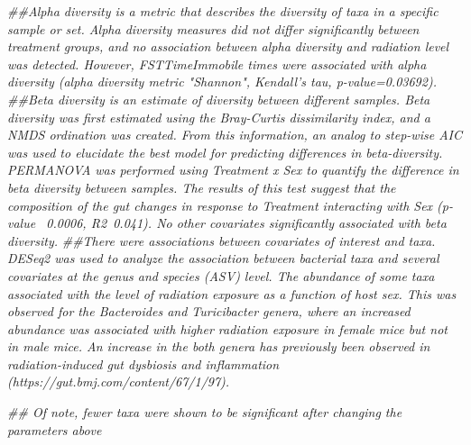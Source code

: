 \documentclass[]{article}
\newenvironment{Shaded}{\begin{snugshade}}{\end{snugshade}}
\newcommand{\CommentTok}[1]{\textcolor[rgb]{0.56,0.35,0.01}{\textit{#1}}}
\begin{document}
\begin{Shaded}
\begin{Highlighting}[]
\CommentTok{##Alpha diversity is a metric that describes the diversity of taxa in a specific sample or set. Alpha diversity measures did not differ significantly between treatment groups, and no association between alpha diversity and radiation level was detected. However, FSTTimeImmobile times were associated with alpha diversity (alpha diversity metric "Shannon", Kendall's tau, p-value=0.03692).}
\CommentTok{##Beta diversity is an estimate of diversity between different samples. Beta diversity was first estimated using the Bray-Curtis dissimilarity index, and a NMDS ordination was created. From this information, an analog to step-wise AIC was used to elucidate the best model for predicting differences in beta-diversity. PERMANOVA was performed using Treatment x Sex to quantify the difference in beta diversity between samples. The results of this test suggest that the composition of the gut changes in response to Treatment interacting with Sex (p-value ~0.0006, R2~0.041). No other covariates significantly associated with beta diversity.}
\CommentTok{##There were associations between covariates of interest and taxa. DESeq2 was used to analyze the association between bacterial taxa and several covariates at the genus and species (ASV) level. The abundance of some taxa associated with the level of radiation exposure as a function of host sex. This was observed for the Bacteroides and Turicibacter genera, where an increased abundance was associated with higher radiation exposure in female mice but not in male mice. An increase in the both genera has previously been observed in radiation-induced gut dysbiosis and inflammation (https://gut.bmj.com/content/67/1/97).}



\CommentTok{## Of note, fewer taxa were shown to be significant after changing the parameters above}
\end{Highlighting}
\end{Shaded}
\end{document}
